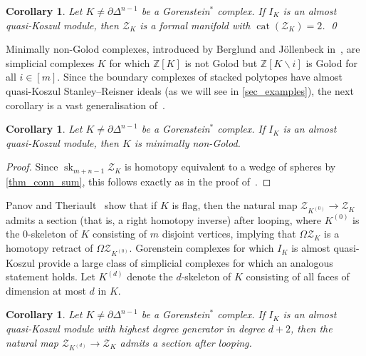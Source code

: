 \documentclass[a4paper,10pt]{amsart}
\newtheorem{corollary}[theorem]{Corollary}
\theoremstyle{definition}
\theoremstyle{remark}
\begin{document}
\begin{corollary}
Let $K\neq\partial\Delta^{n-1}$ be a Gorenstein$^*$ complex. If $I_K$ is an almost quasi-Koszul module, then $\mathcal{Z}_K$ is a formal manifold with $\operatorname{cat}(\mathcal{Z}_K)=2$. \qed
\end{corollary}

Minimally non-Golod complexes, introduced by Berglund and J\"ollenbeck in~\cite{BJ}, are simplicial complexes $K$ for which $\mathbb{Z}[K]$ is not Golod but $\mathbb{Z}[K\smallsetminus i]$ is Golod for all $i\in[m]$. Since the boundary complexes of stacked polytopes have almost quasi-Koszul Stanley--Reisner ideals (as we will see in \cref{sec_examples}), the next corollary is a vast generalisation of~\cite[Theorem~5]{BJ}.

\begin{corollary} \label{cor_mnGolod}
Let $K\neq\partial\Delta^{n-1}$ be a Gorenstein$^*$ complex. If $I_K$ is an almost quasi-Koszul module, then $K$ is minimally non-Golod.
\end{corollary}

\begin{proof}
Since $\operatorname{sk}_{m+n-1}\mathcal{Z}_K$ is homotopy equivalent to a wedge of spheres by \cref{thm_conn_sum}, this follows exactly as in the proof of~\cite[Theorem~1.1]{Am}.
\end{proof}

Panov and Theriault~\cite[Theorem~1.1]{PT} show that if $K$ is flag, then the natural map $\mathcal{Z}_{K^{(0)}} \to \mathcal{Z}_K$ admits a section (that is, a right homotopy inverse) after looping, where $K^{(0)}$ is the $0$-skeleton of $K$ consisting of $m$ disjoint vertices, implying that $\Omega\mathcal{Z}_K$ is a homotopy retract of $\Omega\mathcal{Z}_{K^{(0)}}$. Gorenstein complexes for which $I_K$ is almost quasi-Koszul provide a large class of simplicial complexes for which an analogous statement holds. Let $K^{(d)}$ denote the $d$-skeleton of $K$ consisting of all faces of dimension at most $d$ in $K$.

\begin{corollary} \label{cor_section}
Let $K\neq\partial\Delta^{n-1}$ be a Gorenstein$^*$ complex. If $I_K$ is an almost quasi-Koszul module with highest degree generator in degree $d+2$, then the natural map $\mathcal{Z}_{K^{(d)}} \to \mathcal{Z}_K$ admits a section after looping.
\end{corollary}
\end{document}
